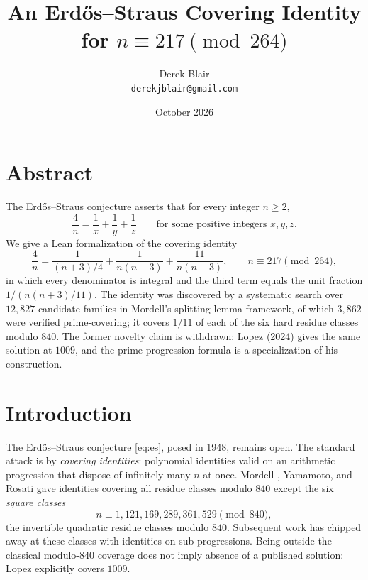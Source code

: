 \documentclass[11pt,a4paper]{article}
\title{An Erd\H{o}s--Straus Covering Identity\\ for $n \equiv 217 \pmod{264}$}
\author{Derek Blair \\ \texttt{derekjblair@gmail.com}}
\date{October 2026}
\theoremstyle{definition}
\begin{document}
\maketitle

\section{Abstract}

The Erd\H{o}s--Straus conjecture asserts that for every integer $n \geq 2$,
\begin{equation}
  \label{eq:es}
  \frac{4}{n} = \frac{1}{x} + \frac{1}{y} + \frac{1}{z}
  \qquad\text{for some positive integers } x, y, z.
\end{equation}
We give a Lean formalization of the covering identity
\begin{equation}
  \label{eq:main}
  \frac{4}{n} = \frac{1}{(n+3)/4} + \frac{1}{n(n+3)}
               + \frac{11}{n(n+3)},
  \qquad n \equiv 217 \pmod{264},
\end{equation}
in which every denominator is integral and the third term equals the unit
fraction $1/(n(n+3)/11)$. The identity was discovered by a systematic search
over $12{,}827$ candidate families in Mordell's splitting-lemma framework,
of which $3{,}862$ were verified prime-covering; it covers $1/11$ of each
of the six hard residue classes modulo $840$. The former novelty claim is
withdrawn: Lopez (2024) \cite{lopez2024} gives the same solution at $1009$,
and the prime-progression formula is a specialization of his construction.

\section{Introduction}

The Erd\H{o}s--Straus conjecture \eqref{eq:es}, posed in 1948, remains open.
The standard attack is by \emph{covering identities}: polynomial identities
valid on an arithmetic progression that dispose of infinitely many $n$ at
once. Mordell \cite{mordell1967}, Yamamoto, and Rosati gave identities
covering all residue classes modulo $840$ except the six \emph{square
classes}
\begin{equation}
  \label{eq:squareclasses}
  n \equiv 1, 121, 169, 289, 361, 529 \pmod{840},
\end{equation}
the invertible quadratic residue classes modulo $840$. Subsequent work has
chipped away at these classes with identities on sub-progressions. Being
outside the classical modulo-$840$ coverage does not imply absence of a
published solution: Lopez \cite{lopez2024} explicitly covers $1009$.
\end{document}
